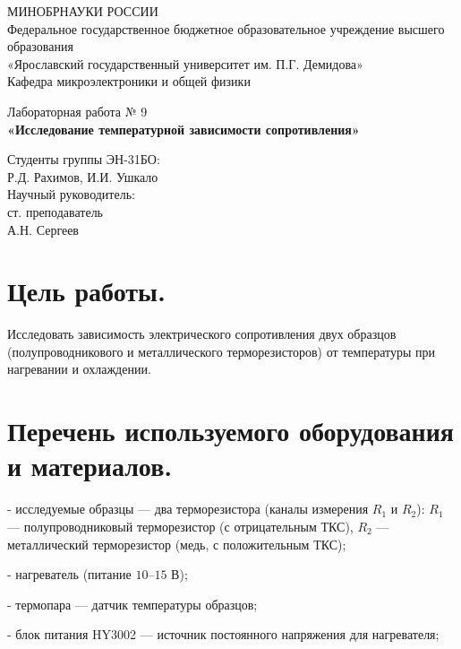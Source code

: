 \documentclass[12pt, a4paper]{article}
\begin{document}
	\onehalfspacing
	\thispagestyle{fancy}
	
	\begin{center}
		МИНОБРНАУКИ РОССИИ\\
		Федеральное государственное бюджетное образовательное учреждение высшего образования\\
		«Ярославский государственный университет им. П.Г. Демидова»\\[3mm]
		Кафедра микроэлектроники и общей физики
	\end{center}
	
	\vspace{55mm}
	
	\begin{center}
		Лабораторная работа № 9\\[3mm]
		\textbf{«Исследование температурной зависимости сопротивления»}
	\end{center}
	
	\vspace{20mm}
	
	\begin{flushright}
		Студенты группы ЭН-31БО:\\
		Р.Д. Рахимов, И.И. Ушкало\\[5mm]
		Научный руководитель:\\
		ст. преподаватель\\
		А.Н. Сергеев
	\end{flushright}
	
	\newpage
	
	\section{Цель работы.}
	Исследовать зависимость электрического сопротивления двух образцов (полупроводникового и металлического терморезисторов) от температуры при нагревании и охлаждении.
	
	\section{Перечень используемого оборудования и материалов.}
	- исследуемые образцы --- два терморезистора (каналы измерения $R_1$ и $R_2$): $R_1$ --- полупроводниковый терморезистор (с отрицательным ТКС), $R_2$ --- металлический терморезистор (медь, с положительным ТКС);
	
	- нагреватель (питание $10$--$15$ В);
	
	- термопара --- датчик температуры образцов;
	
	- блок питания HY3002 --- источник постоянного напряжения для нагревателя;
	
\end{document}
